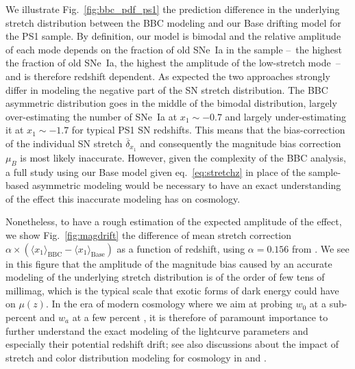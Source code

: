 \documentclass[]{aa} %
\newcommand{\mr}[1]{{\textcolor[rgb]{0.60,0.10,0.6}{#1}}}
\begin{document}
\mr{We illustrate Fig.~\ref{fig:bbc_pdf_ps1} the prediction difference in the
underlying stretch distribution between the BBC modeling and our Base drifting
model for the PS1 sample. By definition, our model is bimodal and the relative
amplitude of each mode depends on the fraction of old SNe~Ia in the sample
--~the highest the fraction of old SNe~Ia, the highest the amplitude of the
low-stretch mode~-- and is therefore redshift dependent. As expected the two
approaches strongly differ in modeling the negative part of the SN stretch
distribution. The BBC asymmetric distribution goes in the middle of the bimodal
distribution, largely over-estimating the number of SNe~Ia at $x_1\sim-0.7$ and
largely under-estimating it at $x_1\sim-1.7$ for typical PS1 SN redshifts. This
means that the bias-correction of the individual SN stretch
$\overline{\delta}_{x_1}$ \citep{kessler2017} and consequently the magnitude
bias correction $\mu_B$ is most likely inaccurate. However, given the complexity
of the BBC analysis, a full study using our Base model given
eq.~\ref{eq:stretchz} in place of the sample-based asymmetric modeling would be
necessary to have an exact understanding of the effect this inaccurate modeling
has on cosmology.}

\mr{Nonetheless, to have a rough estimation of the expected amplitude of the
effect, we show Fig.~\ref{fig:magdrift} the difference of mean stretch
correction $\alpha\times\left(\langle x_1 \rangle_{\mathrm{BBC}} - \langle x_1
\rangle_{\mathrm{Base}}\right)$ as a function of redshift, using $\alpha=0.156$
from \cite{scolnic2018a}. We see in this figure that the amplitude of the
magnitude bias caused by an accurate modeling of the underlying stretch
distribution is of the order of few tens of millimag, which is the typical scale
that exotic forms of dark energy could have on $\mu(z)$. In the era of modern
cosmology where we aim at probing $w_0$ at a sub-percent and $w_a$ at a few
percent \citep[e.g.,][]{lsstpaper}, it is therefore of paramount importance to
further understand the exact modeling of the lightcurve parameters and
especially their potential redshift drift; see also discussions about the impact
of stretch and color distribution modeling for cosmology in \citealt{rubin2015}
and \citealt{rubin2016}.}
\end{document}
